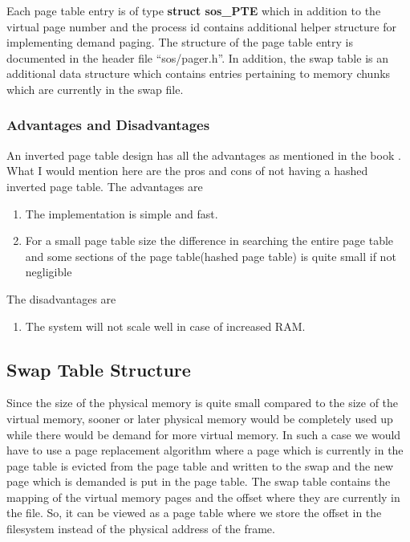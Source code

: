 \documentclass[a4paper, 11pt]{article}
\begin{document}
Each page table entry is of type {\bf struct sos\_PTE} which in
addition to the virtual page number and the process id contains
additional helper structure for implementing demand paging. The
structure of the page table entry is documented in the header file
``sos/pager.h''. In addition, the swap table is an additional data
structure which contains entries pertaining to memory chunks which are
currently in the swap file.

\subsubsection{Advantages and Disadvantages}
An inverted page table design has all the advantages as mentioned in
the book \cite[Page~395]{tanenbaum}. What I would mention here are the
pros and cons of not having a hashed inverted page table. The
advantages are
\begin{enumerate}
\item The implementation is simple and fast.
\item For a small page table size the difference in searching the entire
  page table and some sections of the page table(hashed page table) is
  quite small if not negligible
\end{enumerate}
The disadvantages are
\begin{enumerate}
\item The system will not scale well in case of increased RAM.
\end{enumerate}
 
\subsection{Swap Table Structure}
Since the size of the physical memory is quite small compared to the
size of the virtual memory, sooner or later physical memory would be
completely used up while there would be demand for more virtual
memory. In such a case we would have to use a page replacement
algorithm where a page which is currently in the page table is evicted
from the page table and written to the swap and the new page which is
demanded is put in the page table. The swap table contains the mapping
of the virtual memory pages and the offset where they are currently in
the file. So, it can be viewed as a page table where we store the
offset in the filesystem instead of the physical address of the frame.
\end{document}
